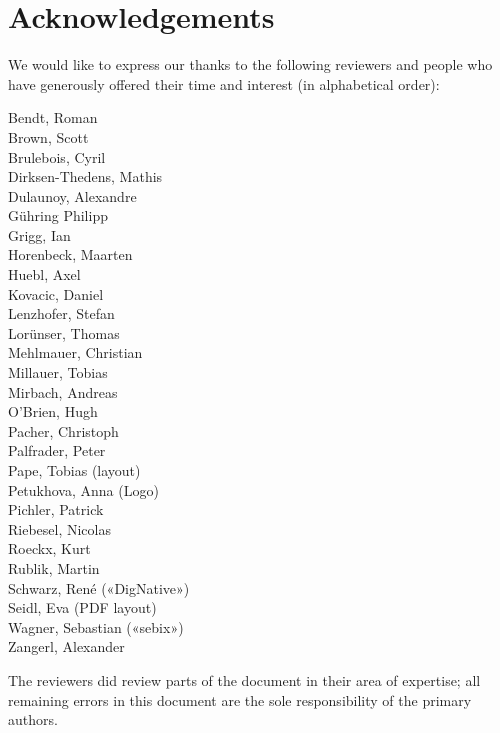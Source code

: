 \clearpage
\section*{Acknowledgements}
\label{section:Reviewers}

We would like to express our thanks to the following reviewers and people who have generously offered their time and interest (in alphabetical order):

\begin{multicols}{2}{\parskip=0pt\centering\obeylines%
Bendt, Roman\\
Brown, Scott \\
Brulebois, Cyril \\
Dirksen-Thedens, Mathis \\
Dulaunoy, Alexandre \\
Gühring Philipp  \\
Grigg, Ian  \\
Horenbeck, Maarten \\
Huebl, Axel \\
Kovacic, Daniel \\
Lenzhofer, Stefan \\
Lorünser, Thomas \\
Mehlmauer, Christian \\
Millauer, Tobias \\
Mirbach, Andreas \\
O'Brien, Hugh \\
Pacher, Christoph \\
Palfrader, Peter \\
Pape, Tobias (layout) \\
Petukhova, Anna (Logo) \\
Pichler, Patrick \\
Riebesel, Nicolas \\
Roeckx, Kurt \\
Rublik, Martin \\
Schwarz, René («DigNative») \\
Seidl, Eva (PDF layout) \\
Wagner, Sebastian («sebix») \\
Zangerl, Alexander \\
}\end{multicols}





The reviewers did review parts of the document in their area of
expertise; all remaining errors in this document are the sole
responsibility of the primary authors.




